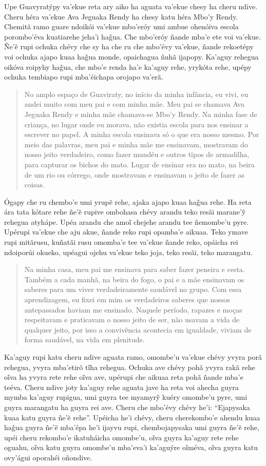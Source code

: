 Upe Guavyratýpy va'ekue reta ary aiko ha aguata va'ekue chesy ha cheru
ndive. Cheru héra va'ekue Ava Jeguaka Rendy ha chesy katu héra Mbo'y
Rendy. Chemitã ramo guare ndoikói va'ekue mbo'eróy umi ambue ohenóiva
escola porombo'éva kuatiarehe jeha'i hag̃ua. Che mbo'eróy ñande mba'e ete
voi va'ekue. Ñe'ẽ rupi ochuka chévy che sy ha che ru che mbo'évy
va'ekue, ñande rekoetépy voi ochuka ajapo kuaa hag̃ua monde, opaichagua
ñuhã ijapopy. Ka'aguy rehegua oikóva roipyhy hag̃ua, che mbo'e renda ha'e
ka'aguy rehe, yrykóta rehe, upépy ochuka tembiapo rupi mba'éichapa
orojapo va'erã.

\begin{quote}
No amplo espaço de Guaviraty, no início da minha infância, eu vivi, eu
andei muito com meu pai e com minha mãe. Meu pai se chamava Ava Jeguaka
Rendy e minha mãe chamava-se Mbo'y Rendy. Na minha fase de criança, no
lugar onde eu morava, não existia escola para nos ensinar a escrever no
papel. A minha escola ensinava só o que era nosso mesmo. Por meio das
palavras, meu pai e minha mãe me ensinavam, mostravam do nosso jeito
verdadeiro, como fazer mundéu e outros tipos de armadilha, para capturar
os bichos do mato. Lugar de ensinar era no mato, na beira de um rio ou
córrego, onde mostravam e ensinavam o jeito de fazer as coisas.
\end{quote}

Ógapy che ru chembo'e umi yrupẽ rehe, ajaka ajapo kuaa hag̃ua rehe. Ha
reta ára tata kótare rehe ñe'ẽ rupive ombohasa chévy arandu teko resãi
marane'ỹ rehegua atyhápe. Upéa arandu che amoĩ chejehe arandu tee
ñemombe'u pyre. Upérupi va'ekue che aju akue, ñande reko rupi opamba'e
aikuaa. Teko ymave rupi mitãrusu, kuñatãi rusu omomba'e tee va'ekue
ñande reko, opáicha rei ndoiporúi okueko, upéagui ojehu va'ekue teko
joja, teko resãi, teko marangatu.

\begin{quote}
Na minha casa, meu pai me ensinava para saber fazer peneira e cesta.
Também a cada manhã, na beira do fogo, o pai e a mãe ensinavam os
saberes para um viver verdadeiramente saudável no grupo. Com essa
aprendizagem, eu fixei em mim os verdadeiros saberes que nossos
antepassados haviam me ensinado. Naquele período, rapazes e moças
respeitavam e praticavam o nosso jeito de ser, não usavam a vida de
qualquer jeito, por isso a convivência acontecia em igualdade, viviam de
forma saudável, na vida em plenitude.
\end{quote}

Ka'aguy rupi katu cheru ndive aguata ramo, omombe'u va'ekue chévy yvyra
porã rehegua, yvyra mba'etirõ tĩha rehegua. Ochuka ave chévy pohã yvyra
rakã rehe oĩva ha yvyra rete rehe oĩva ave, upérupi che aikuaa reta pohã
ñande mba'e teéva. Cheru ndive joty ka'aguy rehe aguata jave ha reta voi
ahecha guyra mymba ka'aguy rupigua, umi guyra tee myamyrỹ kuéry omombe'u
pyre, umi guyra marangatu ha guyra rei ave. Cheru che mbo'évy chévy
he'i: ``Ejapysaka kuaa katu guyra ñe'ẽ rehe''. Upéicha he'i chévy, cheru
cherekombo'e ahendu kuaa hag̃ua guyra ñe'ẽ mba'épa he'i ijayvu rupi,
chembojapysaka umi guyra ñe'ẽ rehe, upéi cheru rekombo'e ikatuháicha
omombe'u, oĩva guyra ka'aguy rete rehe oguahu, oĩva katu guyra omombe'u
mba'eva'i ka'aguýre oĩméva, oĩva guyra katu ovy'águi oporahéi oñondive.

